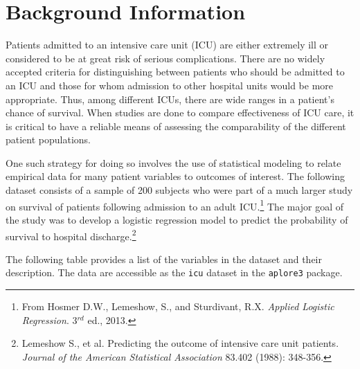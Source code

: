 \documentclass[letterpaper,12pt,twoside,]{pinp}
\begin{document}
\newpage

\hypertarget{background-information}{%
\section{Background Information}\label{background-information}}

Patients admitted to an intensive care unit (ICU) are either extremely
ill or considered to be at great risk of serious complications. There
are no widely accepted criteria for distinguishing between patients who
should be admitted to an ICU and those for whom admission to other
hospital units would be more appropriate. Thus, among different ICUs,
there are wide ranges in a patient's chance of survival. When studies
are done to compare effectiveness of ICU care, it is critical to have a
reliable means of assessing the comparability of the different patient
populations.

One such strategy for doing so involves the use of statistical modeling
to relate empirical data for many patient variables to outcomes of
interest. The following dataset consists of a sample of 200 subjects who
were part of a much larger study on survival of patients following
admission to an adult
ICU.\footnote{From Hosmer D.W., Lemeshow, S., and Sturdivant, R.X. \textit{Applied Logistic Regression}. 3$^{rd}$ ed., 2013.}
The major goal of the study was to develop a logistic regression model
to predict the probability of survival to hospital
discharge.\footnote{Lemeshow S., et al. Predicting the outcome of intensive care unit patients. \textit{Journal of the American Statistical Association} 83.402 (1988): 348-356.}

The following table provides a list of the variables in the dataset and
their description. The data are accessible as the \texttt{icu} dataset
in the \texttt{aplore3} package.
\end{document}
